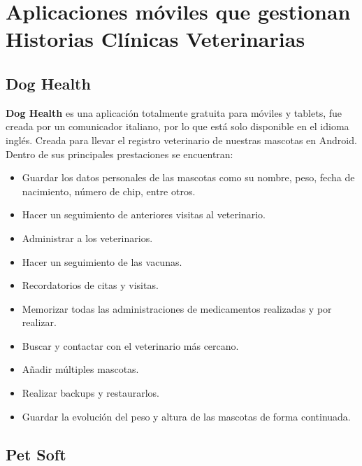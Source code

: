 \section{Aplicaciones móviles que gestionan Historias Clínicas Veterinarias}\label{chapter:introduction}

\subsection{Dog Health}\label{chapter:introduction}




\textbf{Dog Health} es una aplicación totalmente gratuita para móviles y tablets, fue creada por un comunicador italiano, por lo que está solo disponible en el idioma inglés. Creada para llevar el registro veterinario de nuestras mascotas en Android. Dentro de sus principales prestaciones se encuentran:

\begin{itemize}


\item	Guardar los datos personales de las mascotas como su nombre, peso, fecha de nacimiento, número de chip, entre otros.
\item	Hacer un seguimiento de anteriores visitas al veterinario.
\item	Administrar a los veterinarios.
\item	Hacer un seguimiento de las vacunas.
\item	Recordatorios de citas y visitas.
\item	Memorizar todas las administraciones de medicamentos realizadas y por realizar.
\item Buscar y contactar con el veterinario más cercano.
\item	Añadir múltiples mascotas.
\item	Realizar backups y restaurarlos.
\item	Guardar la evolución del peso y altura de las mascotas de forma continuada.

\end{itemize}


\subsection{Pet Soft}\label{chapter:introduction}

